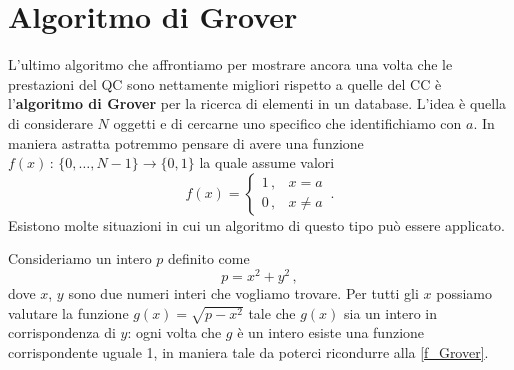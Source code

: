 \section{Algoritmo di Grover}
L'ultimo algoritmo che affrontiamo per mostrare ancora una volta che le prestazioni del QC sono nettamente migliori rispetto a quelle del CC è l'\textbf{algoritmo di Grover} per la ricerca di elementi in un database. L'idea è quella di considerare $N$ oggetti e di cercarne uno specifico che identifichiamo con $a$. In maniera astratta potremmo pensare di avere una funzione $f(x) \, : \, \{0,\dots, N-1\} \rightarrow \{ 0, 1 \}$ la quale assume valori
\begin{equation}\label{f_Grover}
    f(x) =
    \begin{cases}
        1 \, , &x = a \\
        0 \, , &x \neq a
    \end{cases} \, .
\end{equation}
Esistono molte situazioni in cui un algoritmo di questo tipo può essere applicato.

\begin{esempio}
    Consideriamo un intero $p$ definito come
    \begin{equation*}
        p=x^2+y^2 \, ,
    \end{equation*}
    dove $x$, $y$ sono due numeri interi che vogliamo trovare. Per tutti gli $x$ possiamo valutare la funzione $g(x) = \sqrt{p-x^2}$ tale che $g(x)$ sia un intero in corrispondenza di $y$: ogni volta che $g$ è un intero esiste una funzione corrispondente uguale 1, in maniera tale da poterci ricondurre alla \eqref{f_Grover}.
\end{esempio}

